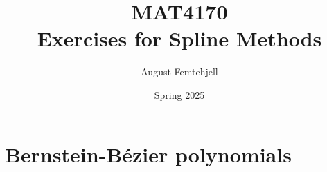 \documentclass[a4paper,12pt]{article}
\title{
    MAT4170\\
    \small{Exercises for Spline Methods}
}
\author{August Femtehjell}
\date{Spring 2025}
\theoremstyle{exerciseStyle}
\theoremstyle{solutionStyle}
\begin{document}
\maketitle

\tableofcontents

\section{Bernstein-Bézier polynomials}


\end{document}
